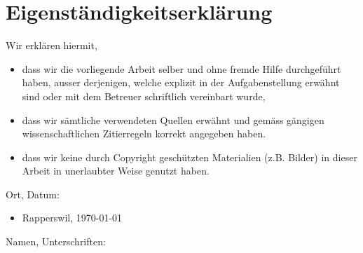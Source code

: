 \chapter{Eigenständigkeitserklärung}

Wir erklären hiermit,
\begin{itemize}
	\item dass wir die vorliegende Arbeit selber und ohne fremde Hilfe durchgeführt haben, ausser derjenigen, welche explizit in der Aufgabenstellung erwähnt sind oder mit dem Betreuer schriftlich vereinbart wurde,
	\item dass wir sämtliche verwendeten Quellen erwähnt und gemäss gängigen wissenschaftlichen Zitierregeln korrekt angegeben haben.
	\item dass wir keine durch Copyright geschützten Materialien (z.B. Bilder) in dieser Arbeit in unerlaubter Weise genutzt haben.
\end{itemize}

\vspace{2cm}

Ort, Datum:

\begin{itemize}
	\item[] Rapperswil, \today
\end{itemize}


\vspace{1cm}
Namen, Unterschriften:

